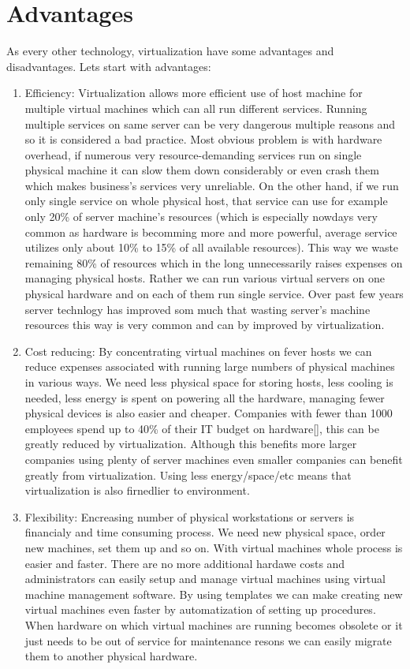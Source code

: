 \section{Advantages}
As every other technology, virtualization have some advantages and disadvantages. Lets start with advantages:
\begin{enumerate}
\item Efficiency: Virtualization allows more efficient use of host machine for multiple virtual machines which can all run different services. Running multiple services on same server can be very dangerous multiple reasons and so it is considered a bad practice. Most obvious problem is with hardware overhead, if numerous very resource-demanding services run on single physical machine it can slow them down considerably or even crash them which makes business's services very unreliable. On the other hand, if we run only single service on whole physical host, that service can use for example only 20\% of server machine's resources (which is especially nowdays very common as hardware is becomming more and more powerful, average service utilizes only about 10\% to 15\% of all available resources). This way we waste remaining 80\% of resources which in the long unnecessarily raises expenses on managing physical hosts. Rather we can run various virtual servers on one physical hardware and on each of them run single service. Over past few years server technlogy has improved som much that wasting server's machine resources this way is very common and can by improved by virtualization. 

\item Cost reducing: By concentrating virtual machines on fever hosts we can reduce expenses associated with running large numbers of physical machines in various ways. We need less physical space for storing hosts, less cooling is needed, less energy is spent on powering all the hardware, managing fewer physical devices is also easier and cheaper. Companies with fewer than 1000 employees spend up to 40\% of their IT budget on hardware[], this can be greatly reduced by virtualization. Although this benefits more larger companies using plenty of server machines even smaller companies can benefit greatly from virtualization. Using less energy/space/etc means that virtualization is also firnedlier to environment.

\item Flexibility: Encreasing number of physical workstations or servers is financialy and time consuming process. We need new physical space, order new machines, set them up and so on. With virtual machines whole process is easier and faster. There are no more additional hardawe costs and administrators can easily setup and manage virtual machines using virtual machine management software. By using templates we can make creating new virtual machines even faster by automatization of setting up procedures. When hardware on which virtual machines are running becomes obsolete or it just needs to be out of service for maintenance resons we can easily migrate them to another physical hardware.


\end{enumerate}
